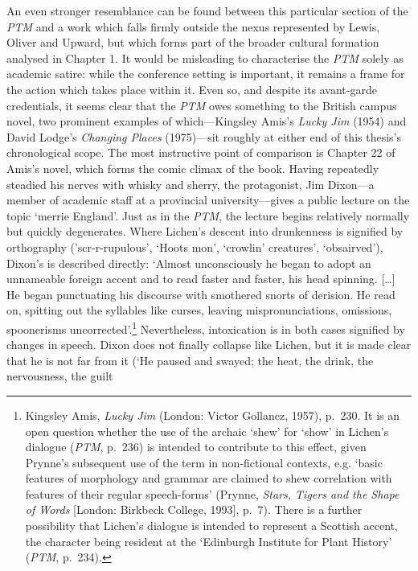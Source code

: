 \documentclass[]{article}
\begin{document}
An even stronger resemblance can be found between this particular
section of the \emph{PTM} and a work which falls firmly outside the
nexus represented by Lewis, Oliver and Upward, but which forms part of
the broader cultural formation analysed in Chapter 1. It would be
misleading to characterise the \emph{PTM} solely as academic satire:
while the conference setting is important, it remains a frame for the
action which takes place within it. Even so, and despite its avant-garde
credentials, it seems clear that the \emph{PTM} owes something to the
British campus novel, two prominent examples of which---Kingsley Amis's
\emph{Lucky Jim} (1954) and David Lodge's \emph{Changing Places}
(1975)---sit roughly at either end of this thesis's chronological scope.
The most instructive point of comparison is Chapter 22 of Amis's novel,
which forms the comic climax of the book. Having repeatedly steadied his
nerves with whisky and sherry, the protagonist, Jim Dixon---a member of
academic staff at a provincial university---gives a public lecture on
the topic `merrie England'. Just as in the \emph{PTM}, the lecture
begins relatively normally but quickly degenerates. Where Lichen's
descent into drunkenness is signified by orthography ('scr-r-rupulous',
`Hoots mon', `crowlin' creatures', `obsairved'), Dixon's is described
directly: `Almost unconsciously he began to adopt an unnameable foreign
accent and to read faster and faster, his head spinning. {[}\ldots{}{]}
He began punctuating his discourse with smothered snorts of derision. He
read on, spitting out the syllables like curses, leaving
mispronunciations, omissions, spoonerisms uncorrected'.\footnote{Kingsley
  Amis, \emph{Lucky Jim} (London: Victor Gollancz, 1957), p.~230. It is
  an open question whether the use of the archaic `shew' for `show' in
  Lichen's dialogue (\emph{PTM}, p.~236) is intended to contribute to
  this effect, given Prynne's subsequent use of the term in
  non-fictional contexts, e.g. `basic features of morphology and grammar
  are claimed to shew correlation with features of their regular
  speech-forms' (Prynne, \emph{Stars, Tigers and the Shape of Words}
  {[}London: Birkbeck College, 1993{]}, p.~7). There is a further
  possibility that Lichen's dialogue is intended to represent a Scottish
  accent, the character being resident at the `Edinburgh Institute for
  Plant History' (\emph{PTM}, p.~234).} Nevertheless, intoxication is in
both cases signified by changes in speech. Dixon does not finally
collapse like Lichen, but it is made clear that he is not far from it
(`He paused and swayed; the heat, the drink, the nervousness, the guilt
\end{document}
